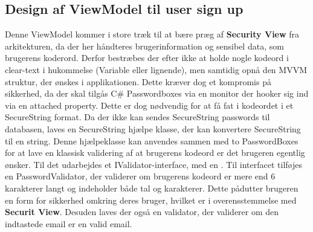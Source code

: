 \documentclass[SoftwareDesign/SoftwareDesign_main.tex]{subfiles}
\begin{document}
\subsection{Design af ViewModel til user sign up}
Denne ViewModel kommer i store træk til at bære præg af \textbf{Security View} fra arkitekturen, da der her håndteres brugerinformation og sensibel data, som brugerens koderord. Derfor bestræbes der efter ikke at holde nogle kodeord i clear-text i hukommelse (Variable eller lignende), men samtidig opnå den MVVM struktur, der ønskes i applikationen. Dette kræver dog et kompromis på sikkerhed, da der skal tilgås C\# Passwordboxes via en monitor der hooker sig ind via en attached property. Dette er dog nødvendig for at få fat i kodeordet i et SecureString format. Da der ikke kan sendes SecureString passwords til databasen, laves en SecureString hjælpe klasse, der kan konvertere SecureString til en string. Denne hjælpeklasse kan anvendes sammen med to PasswordBoxes for at lave en klassisk validering af at brugerens kodeord er det brugeren egentlig ønsker. Til det udarbejdes et IValidator-interface, med en . Til interfacet tilføjes en PasswordValidator, der validerer om brugerens kodeord er mere end 6 karakterer langt og indeholder både tal og karakterer. Dette pådutter brugeren en form for sikkerhed omkring deres bruger, hvilket er i overensstemmelse med \textbf{Securit View}. Desuden laves der også en validator, der validerer om den indtastede email er en valid email.
\end{document}
